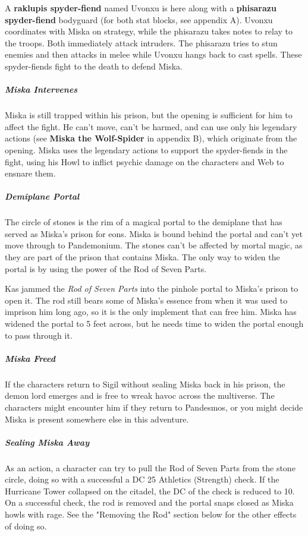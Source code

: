 \documentclass[10pt,a4paper,twoside,bg=print,twocolumn,openany,nodeprecatedcode]{dndbook}
\begin{document}
A \textbf{raklupis spyder-fiend} named Uvonxu is here along with a \textbf{phisarazu spyder-fiend} bodyguard (for both stat blocks, see appendix A). Uvonxu coordinates with Miska on strategy, while the phisarazu takes notes to relay to the troops. Both immediately attack intruders. The phisarazu tries to stun enemies and then attacks in melee while Uvonxu hangs back to cast spells. These spyder-fiends fight to the death to defend Miska.

\subparagraph{Miska Intervenes}
Miska is still trapped within his prison, but the opening is sufficient for him to affect the fight. He can't move, can't be harmed, and can use only his legendary actions (see \textbf{Miska the Wolf-Spider} in appendix B), which originate from the opening. Miska uses the legendary actions to support the spyder-fiends in the fight, using his Howl to inflict psychic damage on the characters and Web to ensnare them.

\subparagraph{Demiplane Portal}
The circle of stones is the rim of a magical portal to the demiplane that has served as Miska's prison for eons. Miska is bound behind the portal and can't yet move through to Pandemonium. The stones can't be affected by mortal magic, as they are part of the prison that contains Miska. The only way to widen the portal is by using the power of the Rod of Seven Parts.

Kas jammed the \textit{Rod of Seven Parts} into the pinhole portal to Miska's prison to open it. The rod still bears some of Miska's essence from when it was used to imprison him long ago, so it is the only implement that can free him. Miska has widened the portal to 5 feet across, but he needs time to widen the portal enough to pass through it.

\subparagraph{Miska Freed}
If the characters return to Sigil without sealing Miska back in his prison, the demon lord emerges and is free to wreak havoc across the multiverse. The characters might encounter him if they return to Pandesmos, or you might decide Miska is present somewhere else in this adventure.

\subparagraph{Sealing Miska Away}
As an action, a character can try to pull the Rod of Seven Parts from the stone circle, doing so with a successful a DC 25 Athletics (Strength) check. If the Hurricane Tower collapsed on the citadel, the DC of the check is reduced to 10. On a successful check, the rod is removed and the portal snaps closed as Miska howls with rage. See the "Removing the Rod" section below for the other effects of doing so.
\end{document}
